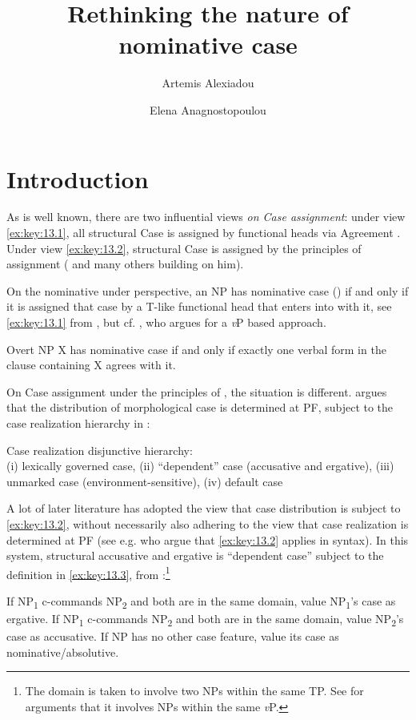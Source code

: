 \documentclass[output=paper]{langsci/langscibook}
\author{Artemis Alexiadou\affiliation{Humboldt Universität zu
    Berlin/Leibniz-Zentrum Allgemeine Sprachwissenschaft}\and Elena
Anagnostopoulou\affiliation{University of Crete}}
\title{Rethinking the nature of nominative case}
\begin{document}
\glsresetall

\section{Introduction}

As is well known, there are two influential views \emph{on Case assignment}:
under view \eqref{ex:key:13.1}, all structural Case is assigned by functional
heads via Agreement \citep{Chomsky2001}. Under view \eqref{ex:key:13.2},
structural Case is assigned by the principles of 
assignment (\citealt{Marantz1991} and many others building on him).

On the nominative under  perspective, an NP has nominative case (\Nom) if
and only if it is assigned that case by a T-like functional head that enters
into  with it, see \eqref{ex:key:13.1} from \citet{Baker2015}, but cf.
\textcite{Sigurdsson2000}, who argues for a \emph{v}P based approach.

\ea\label{ex:key:13.1} Overt NP X has nominative case if and only if exactly
    one verbal form in the clause containing X agrees with it.
\z

On Case assignment under the principles of , the situation is
different. \citet{Marantz1991} argues that the distribution of morphological
case is determined at PF, subject to the case realization hierarchy in
:

\ea%
    \label{ex:key:13.2} Case realization disjunctive hierarchy:\\
    (i) lexically governed case, (ii) \enquote{dependent} case (accusative and
    ergative), (iii) unmarked case (environment-sensitive), (iv) default case
\z

A lot of later literature has adopted the view that case distribution is
subject to \eqref{ex:key:13.2}, without necessarily also adhering to the view
that case realization is determined at PF (see e.g.
\citealt{Preminger2014,Baker2015} who argue that \eqref{ex:key:13.2} applies in
syntax). In this system, structural accusative and ergative is “dependent case”
subject to the definition in \eqref{ex:key:13.3}, from
\citet[74]{Baker2015}:\footnote{The domain is taken to involve two NPs within
    the same TP. See \citet{Schafer2012} for arguments that it involves NPs
within the same \emph{v}P.}

\ea%
    \label{ex:key:13.3}
    \ea If NP\textsubscript{1} c-commands NP\textsubscript{2} and both are in
        the same domain, value NP\textsubscript{1}’s case as ergative.
    \ex If NP\textsubscript{1} c-commands NP\textsubscript{2} and both are in
        the same domain, value NP\textsubscript{2}’s case as accusative.
    \ex If NP has no other case feature, value its case as
        nominative/absolutive.
    \z
\z
\end{document}
